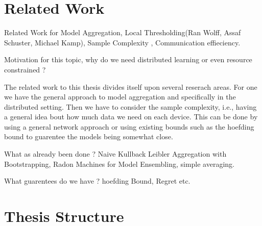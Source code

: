 \section{Related Work}
Related Work for Model Aggregation, Local Thresholding(Ran Wolff, Assaf Schuster, Michael Kamp), Sample Complexity , Communication effieciency.


Motivation for this topic, why do we need distributed learning or even resource constrained ?

The related work to this thesis divides itself upon several reserach areas. 
For one we have the general approach to model aggregation and specifically in the distributed setting.
Then we have to consider the sample complexity, i.e., having a general idea bout how much data we need on each device.
This can be done by using a general network approach or using existing bounds such as the hoefding bound to guarentee the models being somewhat close.

What as already been done ?
Naive Kullback Leibler Aggregation with Bootstrapping, Radon Machines for Model Ensembling, simple averaging.

What guarentees do we have ? 
hoefding Bound, Regret etc.
\section{Thesis Structure}